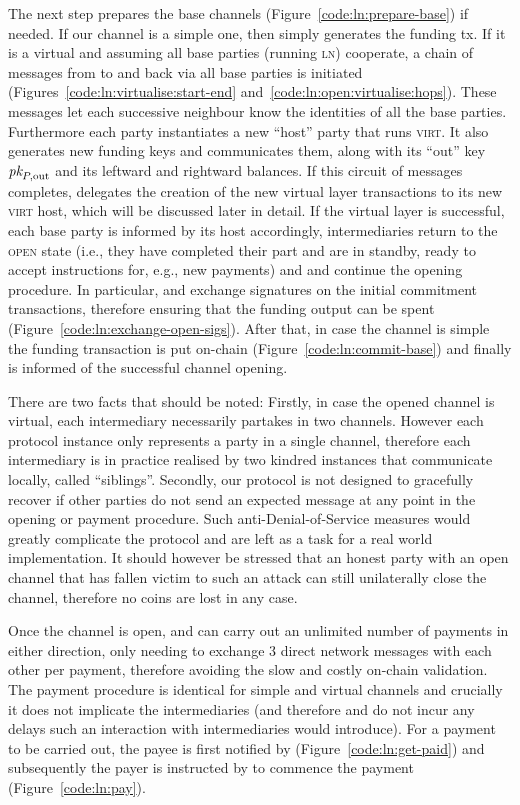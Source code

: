   The next step prepares the base channels (Figure~\ref{code:ln:prepare-base})
  if needed.
  If our channel is a simple one, then \alice simply generates the funding tx.
  If it is a virtual and assuming all base parties (running \textsc{ln})
  cooperate, a chain of messages from \alice to \bob and back via all base
  parties is initiated (Figures~\ref{code:ln:virtualise:start-end}
  and~\ref{code:ln:open:virtualise:hops}). These messages let each successive
  neighbour know the identities of all the base parties. Furthermore each party
  instantiates a new ``host'' party that runs \textsc{virt}. It also generates
  new funding keys and communicates them, along with its ``out'' key $\textit{pk}_{P,
  \mathrm{out}}$ and its
  leftward and rightward balances. If this circuit of messages completes, \alice
  delegates the creation of the new virtual layer transactions to its new
  \textsc{virt} host, which will be discussed later in detail. If the virtual
  layer is successful, each base party is informed by its host accordingly,
  intermediaries return to the \textsc{open} state (i.e., they have completed
  their part and are in standby, ready to accept instructions for, e.g., new
  payments) and \alice and \bob continue
  the opening procedure. In particular, \alice and \bob exchange signatures on
  the initial commitment transactions, therefore ensuring that the funding
  output can be spent (Figure~\ref{code:ln:exchange-open-sigs}). After that, in
  case the channel is simple the funding transaction is put on-chain
  (Figure~\ref{code:ln:commit-base}) and finally \environment is informed of the
  successful channel opening.

  There are two facts that should be noted: Firstly, in case the opened channel
  is virtual, each intermediary necessarily partakes in two channels.
  However each protocol instance only represents a party in a single channel,
  therefore each intermediary is in practice realised by two kindred
  \pchan instances that communicate locally, called ``siblings''. Secondly, our
  protocol is not designed to gracefully recover if other parties do not send an
  expected message at any point in the opening or payment procedure. Such
  anti-Denial-of-Service measures would greatly complicate the protocol and are
  left as a task for a real world implementation. It should however be stressed
  that an honest party with an open channel that has fallen victim to such an
  attack can still unilaterally close the channel, therefore no coins are lost
  in any case.

  Once the channel is open, \alice and \bob can carry out an unlimited number of
  payments in either direction, only needing to exchange $3$ direct network
  messages with each other per payment, therefore avoiding the slow and costly
  on-chain validation. The payment procedure is identical for simple and virtual
  channels and crucially it does not implicate the intermediaries (and therefore
  \alice and \bob do not incur any delays such an interaction with
  intermediaries would introduce). For a payment to be carried out, the payee is
  first notified by \environment (Figure~\ref{code:ln:get-paid}) and
  subsequently the payer is instructed by \environment to commence the payment
  (Figure~\ref{code:ln:pay}).

